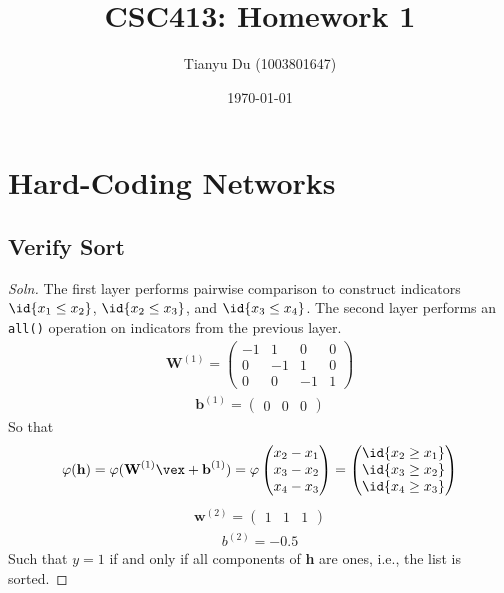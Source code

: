 \documentclass{article}
\title{CSC413: Homework 1}
\date{\today}
\author{Tianyu Du (1003801647)}
\begin{document}
    \maketitle
    \section{Hard-Coding Networks}
    \subsection{Verify Sort}
    \begin{proof}[Soln]
    	The first layer performs pairwise comparison to construct indicators $\id{x_1 \leq x_2}$, $\id{x_2 \leq x_3}$, and $\id{x_3 \leq x_4}$. The second layer performs an \texttt{all()} operation on indicators from the previous layer.
    	\begin{align}
    		\textbf{W}^{(1)} = 
    		\begin{pmatrix}
    			-1 & 1 & 0 & 0 \\
    			0 & -1 & 1 & 0 \\
    			0 & 0 & -1 & 1
    		\end{pmatrix}
    	\end{align}
    	\begin{align}
    		\textbf{b}^{(1)} = 
    		\begin{pmatrix}
    			0 & 0 & 0
    		\end{pmatrix}
    	\end{align}
    	So that 
    	\begin{align}
    		\varphi(\textbf{h}) = \varphi(\textbf{W}^{(1)} \vex + \textbf{b}^{(1)}) =
    		\varphi \begin{pmatrix}
    			x_2 - x_1 \\
    			x_3 - x_2 \\
    			x_4 - x_3
    		\end{pmatrix} =
    		\begin{pmatrix}
    			\id{x_2 \geq x_1} \\
    			\id{x_3 \geq x_2} \\
    			\id{x_4 \geq x_3}
    		\end{pmatrix}
    	\end{align}
    	\begin{align}
    		\textbf{w}^{(2)} = 
    		\begin{pmatrix}
    			1 & 1 & 1
    		\end{pmatrix}
    	\end{align}
    	\begin{align}
    		b^{(2)} = - 0.5
    	\end{align}
    	Such that $y = 1$ if and only if all components of \textbf{h} are ones, i.e., the list is sorted.
    \end{proof}
\end{document}
